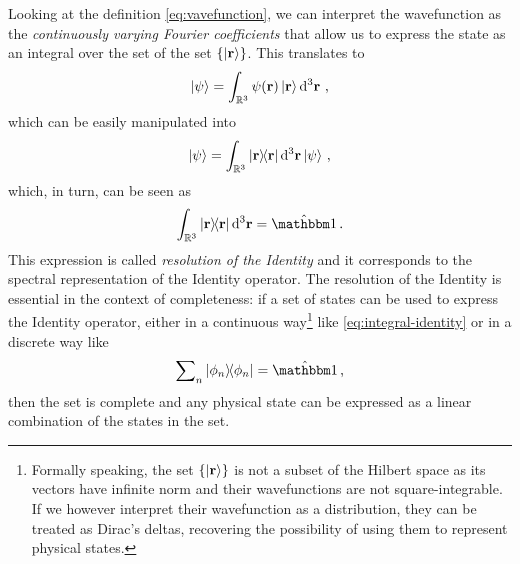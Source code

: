             Looking at the definition \eqref{eq:vavefunction}, we can interpret the wavefunction as the \emph{continuously varying Fourier coefficients} that allow us to express the state as an integral over the set of the set $\qty{\ket{\vb{r}}}$. This translates to
            \begin{equation*}
                \ket{\psi} = \int\nolimits_{\bbR^3} \psi\pqty{\vb{r}} \ket{\vb{r}} \dd[3]{\vb{r}}
                \mycomma
            \end{equation*}
            which can be easily manipulated into
            \begin{equation*}
                \ket{\psi} = \int\nolimits_{\bbR^3} \dyad{\vb{r}}{\vb{r}} \dd[3]{\vb{r}} \ket{\psi}
                \mycomma
            \end{equation*}
            which, in turn, can be seen as
            \begin{equation}
                \label{eq:integral-identity}
                \int\nolimits_{\bbR^3} \dyad{\vb{r}}{\vb{r}} \dd[3]{\vb{r}} = \hidM
                \myperiod
            \end{equation}
            This expression is called \emph{resolution of the Identity} and it corresponds to the spectral representation of the Identity operator. The resolution of the Identity is essential in the context of completeness: if a set of states can be used to express the Identity operator, either in a continuous way\footnote{Formally speaking, the set $\qty{\ket{\vb{r}}}$ is not a subset of the Hilbert space as its vectors have infinite norm and their wavefunctions are not square-integrable. If we however interpret their wavefunction as a distribution, they can be treated as Dirac's deltas, recovering the possibility of using them to represent physical states.} like \eqref{eq:integral-identity} or in a discrete way like
            \begin{equation*}
                \sum\nolimits_n \dyad{\phi_n}{\phi_n} = \hidM
                \mycomma
            \end{equation*}
            then the set is complete and any physical state can be expressed as a linear combination of the states in the set.
        
